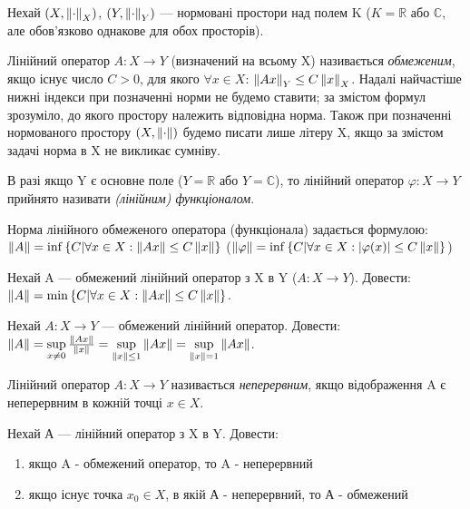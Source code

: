 
\begin{theory}
    Нехай $(X, \left\lVert\cdot\right\rVert_X)$, $(Y, \left\lVert\cdot\right\rVert_Y)$ --- нормовані простори над полем K ($K = 
    \mathbb{R}$ або $\mathbb{C}$, 
    але обов'язково однакове для обох просторів). 

    Лінійний оператор $A: X \rightarrow Y$ (визначений на всьому X) називається 
    \emph{обмеженим}, якщо існує число $C > 0$, для якого $\forall x \in X$: 
    $\left\lVert Ax\right\rVert_Y \leq C \left\lVert x\right\rVert_X$. Надалі найчастіше нижні індекси при позначенні норми 
    не будемо ставити; за змістом формул зрозуміло, до якого простору належить відповідна 
    норма. Також при позначенні нормованого простору $(X, \left\lVert\cdot\right\rVert)$ будемо писати лише 
    літеру X, якщо за змістом задачі норма в X не викликає сумніву. 

    В разі якщо Y є основне поле ($Y=\mathbb{R}$ або $Y = \mathbb{C}$), то лінійний оператор 
    $\varphi: X \rightarrow Y$ прийнято називати \emph{(лінійним) функціоналом}.

    Норма лінійного обмеженого оператора (функціонала) задається формулою: 
    $\left\lVert A\right\rVert = \inf\left\{C | \forall x \in X : \left\lVert Ax\right\rVert\leq C\left\lVert x\right\rVert \right\}$
    ($\left\lVert\varphi\right\rVert = \inf\left\{C | \forall x \in X : |\varphi(x)|\leq C\left\lVert x\right\rVert \right\}$)
\end{theory}

\begin{exercise}
    Нехай A --- обмежений лінійний оператор з X в Y ($A: X \rightarrow Y$).
    Довести: $\left\lVert A\right\rVert = \min\left\{C|\forall x \in X : \left\lVert Ax\right\rVert \leq C\left\lVert x\right\rVert\right\}$.
\end{exercise}

\begin{exercise}
    Нехай $A: X \rightarrow Y$ --- обмежений лінійний оператор.
    Довести: $\left\lVert A\right\rVert = \sup\limits_{x \neq 0}\frac{\left\lVert Ax\right\rVert}{\left\lVert x\right\rVert} = 
    \sup\limits_{\left\lVert x\right\rVert \leq 1}\left\lVert Ax\right\rVert = \sup\limits_{\left\lVert x\right\rVert = 1}\left\lVert Ax\right\rVert$.
\end{exercise}

\begin{theory}
    Лінійний оператор $A: X \rightarrow Y$ називається \emph{неперервним}, якщо відображення 
    A є неперервним в кожній точці $x \in X$.
\end{theory}

\begin{exercise}
    Нехай А --- лінійний оператор з X в Y. Довести: 
    \begin{enumerate}[label=\alph*)]
        \item якщо A - обмежений оператор, то A - неперервний
        \item якщо існує точка $x_0 \in X$, в якій А - неперервний, то А - обмежений
    \end{enumerate}
\end{exercise}

